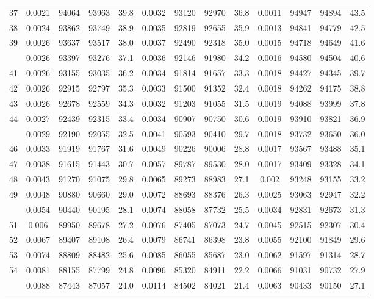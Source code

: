\documentclass[
  14pt,
]{article}
\begin{document}
\begin{longtable}[t]{lcccccccccccc}
37 & 0.0021 & 94064 & 93963 & 39.8 & 0.0032 & 93120 & 92970 & 36.8 & 0.0011 & 94947 & 94894 & 43.5\\
38 & 0.0024 & 93862 & 93749 & 38.9 & 0.0035 & 92819 & 92655 & 35.9 & 0.0013 & 94841 & 94779 & 42.5\\
39 & 0.0026 & 93637 & 93517 & 38.0 & 0.0037 & 92490 & 92318 & 35.0 & 0.0015 & 94718 & 94649 & 41.6\\
\addlinespace
40 & 0.0026 & 93397 & 93276 & 37.1 & 0.0036 & 92146 & 91980 & 34.2 & 0.0016 & 94580 & 94504 & 40.6\\
41 & 0.0026 & 93155 & 93035 & 36.2 & 0.0034 & 91814 & 91657 & 33.3 & 0.0018 & 94427 & 94345 & 39.7\\
42 & 0.0026 & 92915 & 92797 & 35.3 & 0.0033 & 91500 & 91352 & 32.4 & 0.0018 & 94262 & 94175 & 38.8\\
43 & 0.0026 & 92678 & 92559 & 34.3 & 0.0032 & 91203 & 91055 & 31.5 & 0.0019 & 94088 & 93999 & 37.8\\
44 & 0.0027 & 92439 & 92315 & 33.4 & 0.0034 & 90907 & 90750 & 30.6 & 0.0019 & 93910 & 93821 & 36.9\\
\addlinespace
45 & 0.0029 & 92190 & 92055 & 32.5 & 0.0041 & 90593 & 90410 & 29.7 & 0.0018 & 93732 & 93650 & 36.0\\
46 & 0.0033 & 91919 & 91767 & 31.6 & 0.0049 & 90226 & 90006 & 28.8 & 0.0017 & 93567 & 93488 & 35.1\\
47 & 0.0038 & 91615 & 91443 & 30.7 & 0.0057 & 89787 & 89530 & 28.0 & 0.0017 & 93409 & 93328 & 34.1\\
48 & 0.0043 & 91270 & 91075 & 29.8 & 0.0065 & 89273 & 88983 & 27.1 & 0.002 & 93248 & 93155 & 33.2\\
49 & 0.0048 & 90880 & 90660 & 29.0 & 0.0072 & 88693 & 88376 & 26.3 & 0.0025 & 93063 & 92947 & 32.2\\
\addlinespace
50 & 0.0054 & 90440 & 90195 & 28.1 & 0.0074 & 88058 & 87732 & 25.5 & 0.0034 & 92831 & 92673 & 31.3\\
51 & 0.006 & 89950 & 89678 & 27.2 & 0.0076 & 87405 & 87073 & 24.7 & 0.0045 & 92515 & 92307 & 30.4\\
52 & 0.0067 & 89407 & 89108 & 26.4 & 0.0079 & 86741 & 86398 & 23.8 & 0.0055 & 92100 & 91849 & 29.6\\
53 & 0.0074 & 88809 & 88482 & 25.6 & 0.0085 & 86055 & 85687 & 23.0 & 0.0062 & 91597 & 91314 & 28.7\\
54 & 0.0081 & 88155 & 87799 & 24.8 & 0.0096 & 85320 & 84911 & 22.2 & 0.0066 & 91031 & 90732 & 27.9\\
\addlinespace
55 & 0.0088 & 87443 & 87057 & 24.0 & 0.0114 & 84502 & 84021 & 21.4 & 0.0063 & 90433 & 90150 & 27.1\\

\end{longtable}
\end{document}
